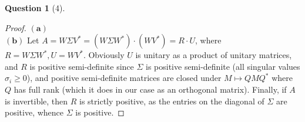\documentclass[11pt]{article}
\theoremstyle{quest}
\newtheorem*{question}{Question}
\begin{document}
\begin{question}[4]
\end{question}
\begin{proof}
$\mathbf{(a)}$ 
\\$\mathbf{(b)}$ Let $A = W\Sigma V^* = (W \Sigma W^*) \cdot (WV^*) = R \cdot U$, where $R = W \Sigma W^*, U = WV^*$. Obviously $U$ is unitary as a product of unitary matrices, and $R$ is positive semi-definite since $\Sigma$ is positive semi-definite (all singular values $\sigma_i \ge 0$), and positive semi-definite matrices are closed under $M \mapsto QMQ^*$ where $Q$ has full rank (which it does in our case as an orthogonal matrix). Finally, if $A$ is invertible, then $R$ is strictly positive, as the entries on the diagonal of $\Sigma$ are positive, whence $\Sigma$ is positive.
\end{proof}
\end{document}
